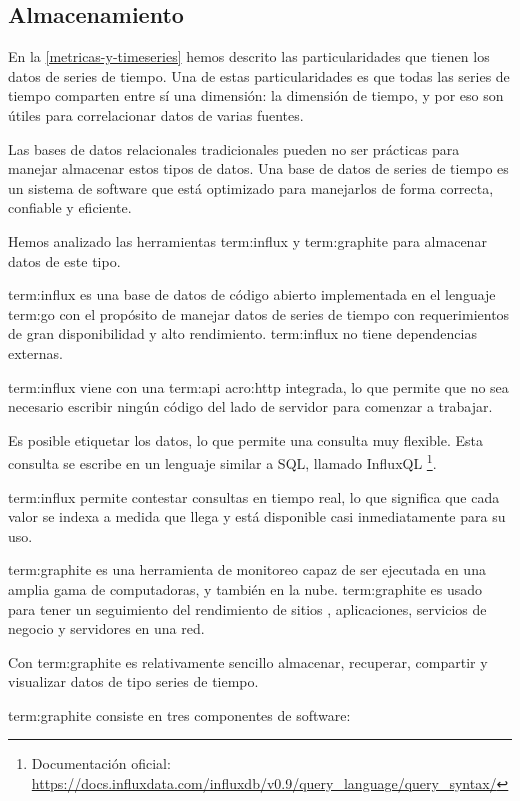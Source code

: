 \subsection{Almacenamiento}
\label{almacenamiento}

En la \autoref{metricas-y-timeseries} hemos descrito las particularidades que
tienen los datos de series de tiempo. Una de estas particularidades es que
todas las series de tiempo comparten entre sí una dimensión: la dimensión de
tiempo, y por eso son útiles para correlacionar datos de varias fuentes.

Las bases de datos relacionales tradicionales pueden no ser prácticas para
manejar almacenar estos tipos de datos. Una base de datos de series de tiempo
es un sistema de software que está optimizado para manejarlos de forma
correcta, confiable y eficiente.

Hemos analizado las herramientas \gls{term:influx} y \gls{term:graphite} para
almacenar datos de este tipo.

\gls{term:influx} es una base de datos de código abierto implementada en el
lenguaje \gls{term:go} con el propósito de manejar datos de series de tiempo
con requerimientos de gran disponibilidad y alto rendimiento. \gls{term:influx}
no tiene dependencias externas.

\gls{term:influx} viene con una \gls{term:api} \gls{acro:http} integrada, lo
que permite que no sea necesario escribir ningún código del lado de servidor
para comenzar a trabajar. \cite{influxdb}

Es posible etiquetar los datos, lo que permite una consulta muy flexible. Esta
consulta se escribe en un lenguaje similar a SQL, llamado InfluxQL
\footnote{Documentación oficial: \url{https://docs.influxdata.com/influxdb/v0.9/query_language/query_syntax/}}.

\gls{term:influx} permite contestar consultas en tiempo real, lo que significa
que cada valor se indexa a medida que llega y está disponible casi
inmediatamente para su uso.

\gls{term:graphite} es una herramienta de monitoreo capaz de ser ejecutada en
una amplia gama de computadoras, y también en la nube. \gls{term:graphite} es
usado para tener un seguimiento del rendimiento de sitios ,
aplicaciones, servicios de negocio y servidores en una red.

Con \gls{term:graphite} es relativamente sencillo almacenar, recuperar,
compartir y visualizar datos de tipo series de tiempo.

\gls{term:graphite} consiste en tres componentes de software:

